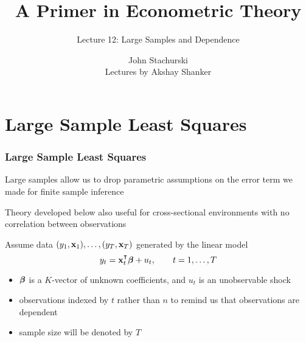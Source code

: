 





\title{A Primer in Econometric Theory}

\subtitle
{Lecture 12: Large Samples and Dependence}

\author{John Stachurski \\ \tiny Lectures by Akshay Shanker}





\begin{frame}
  \titlepage
\end{frame}

\section{Large Sample Least Squares}

\begin{frame}\frametitle{Large Sample Least Squares}

    \vspace{2em}
    Large samples allow us to drop parametric assumptions on the error term we made for finite sample inference 
    
    \vspace{.7em}
    Theory developed below also
    useful for cross-sectional environments with no correlation between
    observations

\end{frame}

\begin{frame}

    \vspace{2em}
    Assume data $(y_1, {\mathbf x}_1), \ldots, (y_T, {\mathbf x}_T)$
    generated by the linear model
    \begin{equation}
        \label{eq:lrtsc}
        y_t = \boldx_t^\T \boldbeta + u_t,
        \qquad t = 1, \ldots, T
    \end{equation}
    
    \begin{itemize}
        \item ${\boldsymbol \beta}$ is a $K$-vector of unknown coefficients, and $u_t$ is an
    unobservable shock
        \item observations indexed by $t$ rather than $n$ to remind
    us that observations are dependent
        \item sample size will be denoted by $T$
    \end{itemize}
    
\end{frame}

